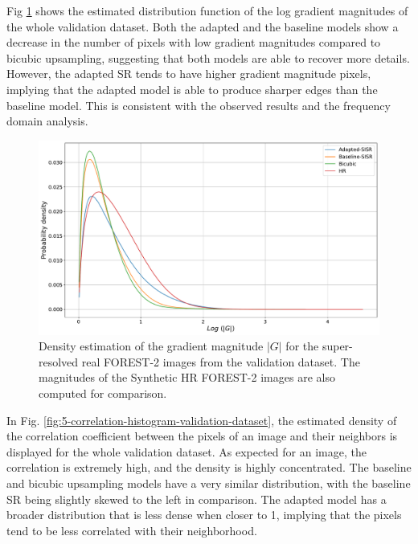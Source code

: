         Fig \ref{fig:5-gradient-histogram-validation-dataset} shows the estimated distribution function of the log gradient magnitudes of the whole validation dataset.
        Both the adapted and the baseline models show a decrease in the number of pixels with low gradient magnitudes compared to bicubic upsampling, suggesting that both models are able to recover more details. 
        However, the adapted SR tends to have higher gradient magnitude pixels, implying that the adapted model is able to produce sharper edges than the baseline model.
        This is consistent with the observed results and the frequency domain analysis.
        
        \begin{figure}[H]
            \centering
            \includegraphics[scale=0.4]{Includes/5-gradient-histogram-validation-dataset.pdf}
            \caption{Density estimation of the gradient magnitude $|G|$ for the super-resolved real FOREST-2 images from the validation dataset. The magnitudes of the Synthetic HR FOREST-2 images are also computed for comparison.}
            \label{fig:5-gradient-histogram-validation-dataset}
        \end{figure}

        In Fig. \ref{fig:5-correlation-histogram-validation-dataset}, the estimated density of the correlation coefficient between the pixels of an image and their neighbors is displayed for the whole validation dataset. 
        As expected for an image, the correlation is extremely high, and the density is highly concentrated. The baseline and bicubic upsampling models have a very similar distribution, with the baseline SR being slightly skewed to the left in comparison.
        The adapted model has a broader distribution that is less dense when closer to 1, implying that the pixels tend to be less correlated with their neighborhood. 
        
